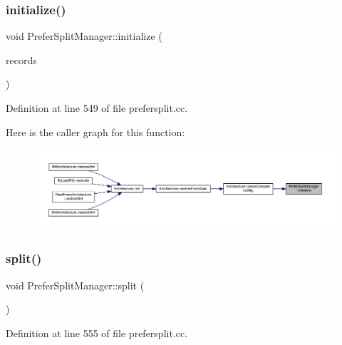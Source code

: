 \subsubsection{\texorpdfstring{initialize()}{initialize()}}
{\footnotesize\ttfamily void Prefer\+Split\+Manager\+::initialize (\begin{DoxyParamCaption}\item[{vector$<$ \mbox{\hyperlink{struct_prefer_split_record}{Prefer\+Split\+Record}} $>$ \&}]{records }\end{DoxyParamCaption})\hspace{0.3cm}{\ttfamily [static]}}



Definition at line 549 of file prefersplit.\+cc.

Here is the caller graph for this function\+:
\nopagebreak
\begin{figure}[H]
\begin{center}
\leavevmode
\includegraphics[width=350pt]{class_prefer_split_manager_a46f56b65a228ce558bc98c307f17f4ef_icgraph}
\end{center}
\end{figure}
\mbox{\label{class_prefer_split_manager_ac57104c8f58add45abec3119b2e89fee}} 
\subsubsection{\texorpdfstring{split()}{split()}}
{\footnotesize\ttfamily void Prefer\+Split\+Manager\+::split (\begin{DoxyParamCaption}\item[{void}]{ }\end{DoxyParamCaption})}



Definition at line 555 of file prefersplit.\+cc.

